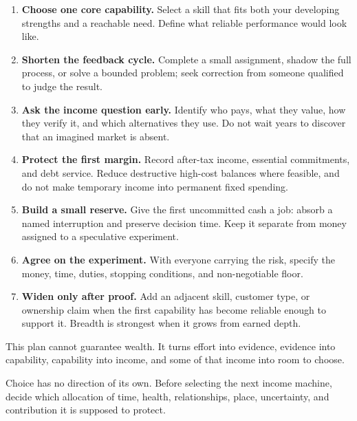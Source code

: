 \begin{enumerate}[itemsep=0.1em,topsep=0.35em,parsep=0pt]
\item \textbf{Choose one core capability.} Select a skill that fits both your
  developing strengths and a reachable need. Define what reliable performance
  would look like.

\item \textbf{Shorten the feedback cycle.} Complete a small assignment, shadow
  the full process, or solve a bounded problem; seek correction from someone
  qualified to judge the result.

\item \textbf{Ask the income question early.} Identify who pays, what they
  value, how they verify it, and which alternatives they use. Do not wait years
  to discover that an imagined market is absent.

\item \textbf{Protect the first margin.} Record after-tax income, essential
  commitments, and debt service. Reduce destructive high-cost balances where
  feasible, and do not make temporary income into permanent fixed spending.

\item \textbf{Build a small reserve.} Give the first uncommitted cash a job:
  absorb a named interruption and preserve decision time. Keep it separate
  from money assigned to a speculative experiment.

\item \textbf{Agree on the experiment.} With everyone carrying the risk,
  specify the money, time, duties, stopping conditions, and non-negotiable
  floor.

\item \textbf{Widen only after proof.} Add an adjacent skill, customer type, or
  ownership claim when the first capability has become reliable enough to
  support it. Breadth is strongest when it grows from earned depth.
\end{enumerate}

This plan cannot guarantee wealth. It turns effort into evidence, evidence into
capability, capability into income, and some of that income into room to choose.

Choice has no direction of its own. Before selecting the next income machine,
decide which allocation of time, health, relationships, place, uncertainty, and
contribution it is supposed to protect.
